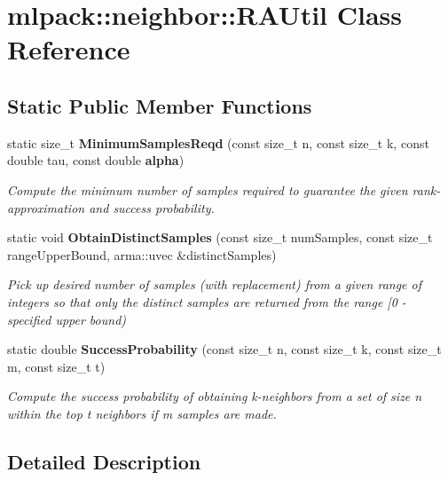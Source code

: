 \section{mlpack\+:\+:neighbor\+:\+:R\+A\+Util Class Reference}
\label{classmlpack_1_1neighbor_1_1RAUtil}
\subsection*{Static Public Member Functions}
\begin{DoxyCompactItemize}
\item 
static size\+\_\+t {\bf Minimum\+Samples\+Reqd} (const size\+\_\+t n, const size\+\_\+t k, const double tau, const double {\bf alpha})
\begin{DoxyCompactList}\small\item\em Compute the minimum number of samples required to guarantee the given rank-\/approximation and success probability. \end{DoxyCompactList}\item 
static void {\bf Obtain\+Distinct\+Samples} (const size\+\_\+t num\+Samples, const size\+\_\+t range\+Upper\+Bound, arma\+::uvec \&distinct\+Samples)
\begin{DoxyCompactList}\small\item\em Pick up desired number of samples (with replacement) from a given range of integers so that only the distinct samples are returned from the range [0 -\/ specified upper bound) \end{DoxyCompactList}\item 
static double {\bf Success\+Probability} (const size\+\_\+t n, const size\+\_\+t k, const size\+\_\+t m, const size\+\_\+t t)
\begin{DoxyCompactList}\small\item\em Compute the success probability of obtaining \textquotesingle{}k\textquotesingle{}-\/neighbors from a set of size \textquotesingle{}n\textquotesingle{} within the top \textquotesingle{}t\textquotesingle{} neighbors if \textquotesingle{}m\textquotesingle{} samples are made. \end{DoxyCompactList}\end{DoxyCompactItemize}


\subsection{Detailed Description}


